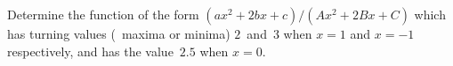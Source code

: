 Determine the function of the form $(ax^{2} + 2bx + c)/(Ax^{2} + 2Bx + C)$
which has turning values (\ie\ maxima or minima) $2$~and~$3$ when $x = 1$ and
$x = -1$ respectively, and has the value~$2.5$ when $x = 0$. 

